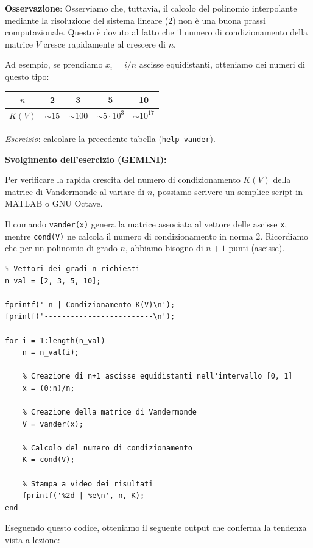 \textbf{Osservazione}: Osserviamo che, tuttavia, il calcolo del polinomio interpolante mediante la risoluzione del sistema lineare (2) non è una buona prassi computazionale. Questo è dovuto al fatto che il numero di condizionamento della matrice $V$ cresce rapidamente al crescere di $n$. 

Ad esempio, se prendiamo $x_i = i/n$ ascisse equidistanti, otteniamo dei numeri di questo tipo:

\begin{center}
\begin{tabular}{|c|c|c|c|c|}
\hline
$n$ & 2 & 3 & 5 & 10 \\
\hline
$K(V)$ & $\sim 15$ & $\sim 100$ & $\sim 5 \cdot 10^3$ & $\sim 10^{17}$ \\
\hline
\end{tabular}
\end{center}

\textit{Esercizio}: calcolare la precedente tabella (\texttt{help vander}).

\vspace{0.5cm}
\textbf{Svolgimento dell'esercizio (GEMINI):}

Per verificare la rapida crescita del numero di condizionamento $K(V)$ della matrice di Vandermonde al variare di $n$, possiamo scrivere un semplice script in MATLAB o GNU Octave. 

Il comando \texttt{vander(x)} genera la matrice associata al vettore delle ascisse \texttt{x}, mentre \texttt{cond(V)} ne calcola il numero di condizionamento in norma 2. Ricordiamo che per un polinomio di grado $n$, abbiamo bisogno di $n+1$ punti (ascisse).

\begin{verbatim}
% Vettori dei gradi n richiesti
n_val = [2, 3, 5, 10];

fprintf(' n | Condizionamento K(V)\n');
fprintf('-------------------------\n');

for i = 1:length(n_val)
    n = n_val(i);
    
    % Creazione di n+1 ascisse equidistanti nell'intervallo [0, 1]
    x = (0:n)/n; 
    
    % Creazione della matrice di Vandermonde
    V = vander(x);
    
    % Calcolo del numero di condizionamento
    K = cond(V);
    
    % Stampa a video dei risultati
    fprintf('%2d | %e\n', n, K);
end
\end{verbatim}

Eseguendo questo codice, otteniamo il seguente output che conferma la tendenza vista a lezione:

